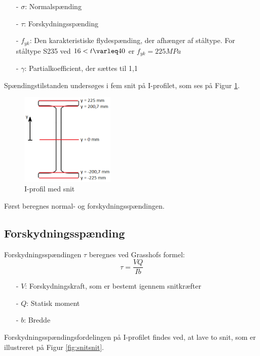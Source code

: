 \begin{itemize}
	\item[-] $\sigma$: Normalspænding 
	\item[-] $\tau$: Forskydningsspænding
	\item[-] $f_{yk}$: Den karakteristiske flydespænding, der afhænger af ståltype. For ståltype S235 ved $16 < t \varleq 40$ er $f_{yk} = 225 MPa$ \citep[ s. 213]{stabi}
	\item[-] $\gamma$: Partialkoefficient, der sættes til 1,1 \citep[ s. 212]{stabi}
\end{itemize}

Spændingstilstanden undersøges i fem snit på I-profilet, som ses på Figur \ref{fig:iprofilsnit}.

\begin{figure}[H]
	\centering
	\includegraphics[width=0.4\textwidth]{billeder/iprofilsnit.png}
	\caption{I-profil med snit}
	\label{fig:iprofilsnit}
\end{figure}

Først beregnes normal- og forskydningsspændingen. 

\subsection{Forskydningsspænding}
Forskydningsspændingen $\tau$ beregnes ved Grasshofs formel:
\begin{equation}
\tau = \frac{VQ}{Ib}
\end{equation}
\begin{itemize}
	\item[-] $V$: Forskydningskraft, som er bestemt igennem snitkræfter
	\item[-] $Q$: Statisk moment
	\item[-] $b$: Bredde
\end{itemize}

Forskydningsspændingsfordelingen på I-profilet findes ved, at lave to snit, som er illustreret på Figur \ref{fig:snitsnit}. 

